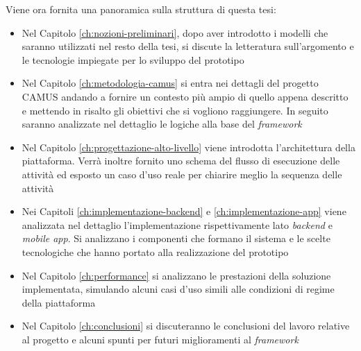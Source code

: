 Viene ora fornita una panoramica sulla struttura di questa tesi:

\begin{itemize}
	\item 
	Nel Capitolo \ref{ch:nozioni-preliminari}, dopo aver introdotto i modelli che saranno utilizzati nel resto della tesi, si discute la letteratura sull'argomento e le tecnologie impiegate per lo sviluppo del prototipo
	\item 
	Nel Capitolo \ref{ch:metodologia-camus} si entra nei dettagli del progetto CAMUS andando a fornire un contesto più ampio di quello appena descritto e mettendo in risalto gli obiettivi che si vogliono raggiungere. In seguito saranno analizzate nel dettaglio le logiche alla base del \emph{framework}
	\item 
	Nel Capitolo \ref{ch:progettazione-alto-livello} viene introdotta l'architettura della piattaforma. Verrà inoltre fornito uno schema del flusso di esecuzione delle attività ed esposto un caso d'uso reale per chiarire meglio la sequenza delle attività
	\item 
	Nei Capitoli \ref{ch:implementazione-backend} e \ref{ch:implementazione-app} viene analizzata nel dettaglio l'implementazione rispettivamente lato \emph{backend} e \emph{mobile app}. Si analizzano i componenti che formano il sistema e le scelte tecnologiche che hanno portato alla realizzazione del prototipo
	\item 
	Nel Capitolo \ref{ch:performance} si analizzano le prestazioni della soluzione implementata, simulando alcuni casi d'uso simili alle condizioni di regime della piattaforma
	\item 
	Nel Capitolo \ref{ch:conclusioni} si discuteranno le conclusioni del lavoro relative al progetto e alcuni spunti per futuri miglioramenti al \emph{framework}
\end{itemize}